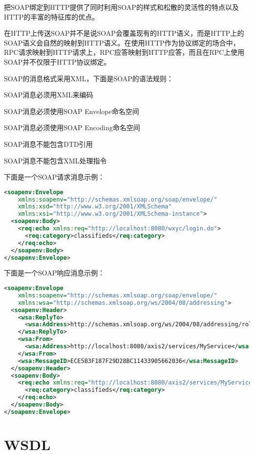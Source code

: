把SOAP绑定到HTTP提供了同时利用SOAP的样式和松散的灵活性的特点以及HTTP的丰富的特征库的优点。

在HTTP上传送SOAP并不是说SOAP会覆盖现有的HTTP语义，而是HTTP上的SOAP语义会自然的映射到HTTP语义。在使用HTTP作为协议绑定的场合中，RPC请求映射到HTTP请求上，RPC应答映射到HTTP应答，而且在RPC上使用SOAP并不仅限于HTTP协议绑定。

SOAP的消息格式采用XML，下面是SOAP的语法规则：

\begin{compactitem}
\item SOAP消息必须用XML来编码
\item SOAP消息必须使用SOAP Envelope命名空间
\item SOAP消息必须使用SOAP Encoding命名空间
\item SOAP消息不能包含DTD引用
\item SOAP消息不能包含XML处理指令
\end{compactitem}

下面是一个SOAP请求消息示例：

\begin{lstlisting}[language=XML]
<soapenv:Envelope
    xmlns:soapenv="http://schemas.xmlsoap.org/soap/envelope/"
    xmlns:xsd="http://www.w3.org/2001/XMLSchema"
    xmlns:xsi="http://www.w3.org/2001/XMLSchema-instance">
  <soapenv:Body>
    <req:echo xmlns:req="http://localhost:8080/wxyc/login.do">
      <req:category>classifieds</req:category>
    </req:echo>
  </soapenv:Body>
</soapenv:Envelope>
\end{lstlisting}

下面是一个SOAP响应消息示例：

\begin{lstlisting}[language=XML]
<soapenv:Envelope
    xmlns:soapenv="http://schemas.xmlsoap.org/soap/envelope/"
    xmlns:wsa="http://schemas.xmlsoap.org/ws/2004/08/addressing">
  <soapenv:Header>
    <wsa:ReplyTo>
      <wsa:Address>http://schemas.xmlsoap.org/ws/2004/08/addressing/role/anonymous</wsa:Address>
    </wsa:ReplyTo>
    <wsa:From>
      <wsa:Address>http://localhost:8080/axis2/services/MyService</wsa:Address>
    </wsa:From>
    <wsa:MessageID>ECE5B3F187F29D28BC11433905662036</wsa:MessageID>
  </soapenv:Header>
  <soapenv:Body>
    <req:echo xmlns:req="http://localhost:8080/axis2/services/MyService/">
      <req:category>classifieds</req:category>
    </req:echo>
  </soapenv:Body>
</soapenv:Envelope>
\end{lstlisting}


\section{WSDL}

